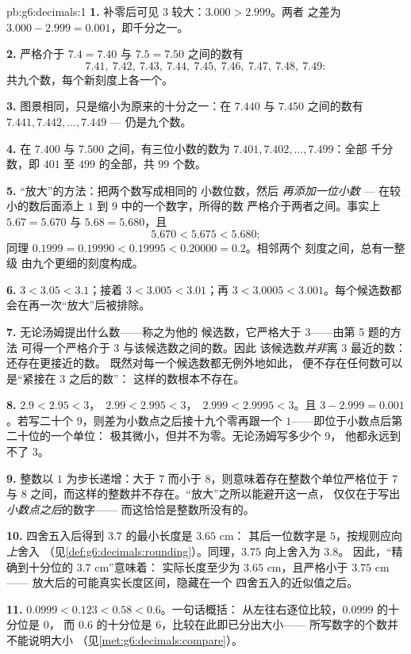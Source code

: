 \begin{solution}{pb:g6:decimals:1}
\textbf{1.} 补零后可见 $3$ 较大：$3.000 > 2.999$。两者
之差为 $3.000 - 2.999 = 0.001$，即千分之一。

\textbf{2.} 严格介于 $7.4 = 7.40$ 与 $7.5 = 7.50$ 之间的数有
\[
7.41,\ 7.42,\ 7.43,\ 7.44,\ 7.45,\ 7.46,\ 7.47,\ 7.48,\ 7.49 :
\]
共九个数，每个新刻度上各一个。

\textbf{3.} 图景相同，只是缩小为原来的十分之一：在 $7.440$
与 $7.450$ 之间的数有 $7.441, 7.442, \dots, 7.449$ ---
仍是九个数。

\textbf{4.} 在 $7.400$ 与 $7.500$ 之间，有三位小数的数为
$7.401, 7.402, \dots, 7.499$：全部
千分数，即 $401$ 至 $499$ 的全部，共 $99$ 个数。

\textbf{5.} “放大”的方法：把两个数写成相同的
小数位数，然后 \emph{再添加一位小数}
--- 在较小的数后面添上 $1$ 到 $9$ 中的一个数字，所得的数
严格介于两者之间。事实上 $5.67 = 5.670$ 与
$5.68 = 5.680$，且
\[
5.670 < 5.675 < 5.680 ;
\]
同理 $0.1999 = 0.19990 < 0.19995 < 0.20000 = 0.2$。相邻两个
刻度之间，总有一整级
由九个更细的刻度构成。

\textbf{6.} $3 < 3.05 < 3.1$；接着 $3 < 3.005 < 3.01$；再
$3 < 3.0005 < 3.001$。每个候选数都会在再一次“放大”后被排除。

\textbf{7.} 无论汤姆提出什么数——称之为他的
候选数，它严格大于 $3$——由第 5 题的方法
可得一个严格介于 $3$ 与该候选数之间的数。因此
该候选数\emph{并非}离 $3$ 最近的数：还存在更接近的数。
既然对每一个候选数都无例外地如此，
便不存在任何数可以是“紧接在 $3$ 之后的数”：
这样的数根本不存在。

\textbf{8.} $2.9 < 2.95 < 3$，\ $2.99 < 2.995 < 3$，\
$2.999 < 2.9995 < 3$。且 $3 - 2.999 = 0.001$。若写二十个
9，则差为小数点之后接十九个零再跟一个
$1$——即位于小数点后第二十位的一个单位：
极其微小，但并不为零。无论汤姆写多少个 9，
他都永远到不了 $3$。

\textbf{9.} 整数以 $1$ 为步长递增：大于 $7$
而小于 $8$，则意味着存在整数个单位严格位于
$7$ 与 $8$ 之间，而这样的整数并不存在。“放大”之所以能避开这一点，
仅仅在于写出\emph{小数点之后}的数字——
而这恰恰是整数所没有的。

\textbf{10.} 四舍五入后得到 $3.7$ 的最小长度是 $3.65$ cm：
其后一位数字是 $5$，按规则应向\emph{上}舍入
（见\cref{def:g6:decimals:rounding}）。同理，$3.75$ 向上舍入为 $3.8$。
因此，“精确到十分位的 $3.7$ cm”意味着：
实际长度至少为 $3.65$ cm，且严格小于 $3.75$ cm——
放大后的可能真实长度区间，隐藏在一个
四舍五入的近似值之后。

\textbf{11.} $0.0999 < 0.123 < 0.58 < 0.6$。一句话概括：
从左往右逐位比较，$0.0999$ 的十分位是 $0$，
而 $0.6$ 的十分位是 $6$，比较在此即已分出大小——
所写数字的个数并不能说明大小
（见\cref{met:g6:decimals:compare}）。


\end{solution}

